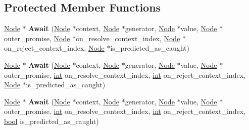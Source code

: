 \subsection*{Protected Member Functions}
\begin{DoxyCompactItemize}
\item 
\mbox{\label{classv8_1_1internal_1_1AsyncBuiltinsAssembler_ad9ed3a4b1a65bd225ec44127ebd17bf6}} 
\mbox{\hyperlink{classv8_1_1internal_1_1compiler_1_1Node}{Node}} $\ast$ {\bfseries Await} (\mbox{\hyperlink{classv8_1_1internal_1_1compiler_1_1Node}{Node}} $\ast$context, \mbox{\hyperlink{classv8_1_1internal_1_1compiler_1_1Node}{Node}} $\ast$generator, \mbox{\hyperlink{classv8_1_1internal_1_1compiler_1_1Node}{Node}} $\ast$value, \mbox{\hyperlink{classv8_1_1internal_1_1compiler_1_1Node}{Node}} $\ast$outer\+\_\+promise, \mbox{\hyperlink{classv8_1_1internal_1_1compiler_1_1Node}{Node}} $\ast$on\+\_\+resolve\+\_\+context\+\_\+index, \mbox{\hyperlink{classv8_1_1internal_1_1compiler_1_1Node}{Node}} $\ast$on\+\_\+reject\+\_\+context\+\_\+index, \mbox{\hyperlink{classv8_1_1internal_1_1compiler_1_1Node}{Node}} $\ast$is\+\_\+predicted\+\_\+as\+\_\+caught)
\item 
\mbox{\label{classv8_1_1internal_1_1AsyncBuiltinsAssembler_af3c8169d38e6daa5d7d3a8f3a144d270}} 
\mbox{\hyperlink{classv8_1_1internal_1_1compiler_1_1Node}{Node}} $\ast$ {\bfseries Await} (\mbox{\hyperlink{classv8_1_1internal_1_1compiler_1_1Node}{Node}} $\ast$context, \mbox{\hyperlink{classv8_1_1internal_1_1compiler_1_1Node}{Node}} $\ast$generator, \mbox{\hyperlink{classv8_1_1internal_1_1compiler_1_1Node}{Node}} $\ast$value, \mbox{\hyperlink{classv8_1_1internal_1_1compiler_1_1Node}{Node}} $\ast$outer\+\_\+promise, \mbox{\hyperlink{classint}{int}} on\+\_\+resolve\+\_\+context\+\_\+index, \mbox{\hyperlink{classint}{int}} on\+\_\+reject\+\_\+context\+\_\+index, \mbox{\hyperlink{classv8_1_1internal_1_1compiler_1_1Node}{Node}} $\ast$is\+\_\+predicted\+\_\+as\+\_\+caught)
\item 
\mbox{\label{classv8_1_1internal_1_1AsyncBuiltinsAssembler_a6d64cebf93c944e9c632ee48cb53a2bf}} 
\mbox{\hyperlink{classv8_1_1internal_1_1compiler_1_1Node}{Node}} $\ast$ {\bfseries Await} (\mbox{\hyperlink{classv8_1_1internal_1_1compiler_1_1Node}{Node}} $\ast$context, \mbox{\hyperlink{classv8_1_1internal_1_1compiler_1_1Node}{Node}} $\ast$generator, \mbox{\hyperlink{classv8_1_1internal_1_1compiler_1_1Node}{Node}} $\ast$value, \mbox{\hyperlink{classv8_1_1internal_1_1compiler_1_1Node}{Node}} $\ast$outer\+\_\+promise, \mbox{\hyperlink{classint}{int}} on\+\_\+resolve\+\_\+context\+\_\+index, \mbox{\hyperlink{classint}{int}} on\+\_\+reject\+\_\+context\+\_\+index, \mbox{\hyperlink{classbool}{bool}} is\+\_\+predicted\+\_\+as\+\_\+caught)

\end{DoxyCompactItemize}
